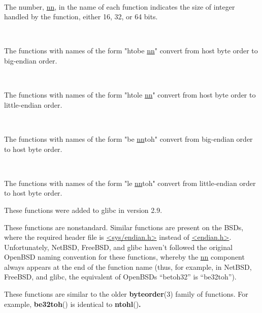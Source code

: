 \documentclass[]{article}
\let\realtextbf=\textbf
\renewcommand{\textbf}[1]{\textcolor{boldcolor}{\realtextbf{#1}}}
\renewcommand{\emph}[1]{\underline{#1}}
\begin{document}
~

The number, \emph{nn}, in the name of each function indicates the size
of integer handled by the function, either 16, 32, or 64 bits.

~

The functions with names of the form "htobe \emph{nn}" convert from host
byte order to big-endian order.

~

The functions with names of the form "htole \emph{nn}" convert from host
byte order to little-endian order.

~

The functions with names of the form "be \emph{nn}toh" convert from
big-endian order to host byte order.

~

The functions with names of the form "le \emph{nn}toh" convert from
little-endian order to host byte order.


These functions were added to glibc in version 2.9.


These functions are nonstandard. Similar functions are present on the
BSDs, where the required header file is
\emph{\textless{}sys/endian.h\textgreater{}} instead of
\emph{\textless{}endian.h\textgreater{}}. Unfortunately, NetBSD,
FreeBSD, and glibc haven't followed the original OpenBSD naming
convention for these functions, whereby the \emph{nn} component always
appears at the end of the function name (thus, for example, in NetBSD,
FreeBSD, and glibc, the equivalent of OpenBSDs ``betoh32'' is
``be32toh'').


These functions are similar to the older \textbf{byteorder}(3) family of
functions. For example, \textbf{be32toh}() is identical to
\textbf{ntohl}()\textbf{.}
\end{document}
